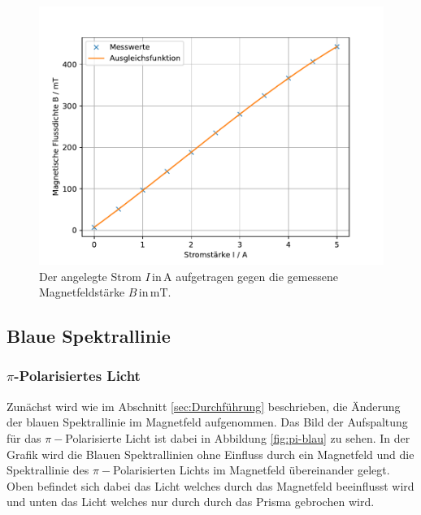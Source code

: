 \begin{figure}
    \centering
    \includegraphics[width=\textwidth]{content/data/magnetfeld.pdf}
    \caption{Der angelegte Strom $I \, \text{in} \, \si{\ampere}$ aufgetragen gegen die gemessene Magnetfeldstärke $B \, \text{in} \, \si{\milli\tesla}$.}
    \label{fig:Magnetfeld}
\end{figure}

\subsection{Blaue Spektrallinie}

\subsubsection{\boldmath \texorpdfstring{$\pi$}{pi}-Polarisiertes Licht}
Zunächst wird wie im Abschnitt \ref{sec:Durchführung} beschrieben, die Änderung der blauen Spektrallinie im Magnetfeld aufgenommen.
Das Bild der Aufspaltung für das $\pi -$Polarisierte Licht ist dabei in Abbildung \ref{fig:pi-blau} zu sehen.
In der Grafik wird die Blauen Spektrallinien ohne Einfluss durch ein Magnetfeld und die Spektrallinie des $\pi -$Polarisierten Lichts im Magnetfeld übereinander gelegt.
Oben befindet sich dabei das Licht welches durch das Magnetfeld beeinflusst wird und unten das Licht welches nur durch durch das Prisma gebrochen wird.

